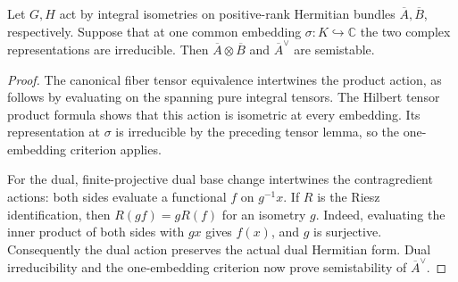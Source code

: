 \begin{lemma}
\label{lem:binary-independent-irreducible-semistable}
\leanok
Let $G,H$ act by integral isometries on positive-rank Hermitian bundles
$\overline A,\overline B$, respectively. Suppose that at one common
embedding $\sigma:K\hookrightarrow\mathbb C$ the two complex representations
are irreducible. Then $\overline A\otimes\overline B$ and
$\overline A^\vee$ are semistable.
\end{lemma}
\begin{proof}
The canonical fiber tensor equivalence intertwines the product action,
as follows by evaluating on the spanning pure integral tensors.
The Hilbert tensor product formula shows that this action is isometric
at every embedding. Its representation at $\sigma$ is irreducible by
the preceding tensor lemma, so the one-embedding criterion applies.

For the dual, finite-projective dual base change intertwines the
contragredient actions: both sides evaluate a functional $f$ on $g^{-1}x$.
If $R$ is the Riesz identification, then
$R(gf)=gR(f)$ for an isometry $g$. Indeed, evaluating the inner product
of both sides with $gx$ gives $f(x)$, and $g$ is surjective.
Consequently the dual action preserves the actual dual Hermitian form.
Dual irreducibility and the one-embedding criterion now prove
semistability of $\overline A^\vee$.
\end{proof}

